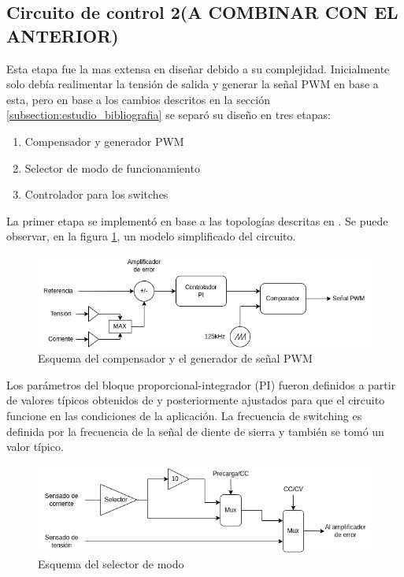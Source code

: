 
\subsection{Circuito de control 2(A COMBINAR CON EL ANTERIOR)}
Esta etapa fue la mas extensa en diseñar debido a su complejidad.
Inicialmente solo debía realimentar la tensión de salida y generar la señal PWM en base a esta,
pero en base a los cambios descritos en la sección \ref{subsection:estudio_bibliografia}
se separó su diseño en tres etapas:

\begin{enumerate}
    \item Compensador y generador PWM
    \item Selector de modo de funcionamiento
    \item Controlador para los switches
\end{enumerate}

La primer etapa se implementó en base a las topologías descritas en \cite{mohan}. Se puede observar,
en la figura \ref{fig:esquema_compensador}, un modelo simplificado del circuito.

\begin{figure}
    \centering
    \includegraphics[width=\textwidth]{images/compensador.png}
    \caption{Esquema del compensador y el generador de señal PWM}
    \label{fig:esquema_compensador}
\end{figure}

Los parámetros del bloque proporcional-integrador (PI) fueron definidos a partir de valores típicos obtenidos de \cite{mohan}
y posteriormente ajustados para que el circuito funcione en las condiciones de la aplicación.
La frecuencia de switching es definida por la frecuencia de la señal de diente de sierra y también se tomó un valor típico.

\begin{figure}
    \centering
    \includegraphics[width=\textwidth]{images/selector.png}
    \caption{Esquema del selector de modo}
    \label{fig:esquema_selector}
\end{figure}

